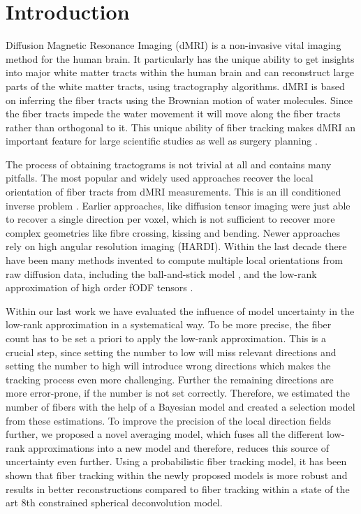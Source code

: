 \section{Introduction}
Diffusion Magnetic Resonance Imaging (dMRI) \cite{LeBihan:1986} is a
non-invasive vital imaging method for the human brain. It particularly has the
unique ability to get insights into major white matter tracts within the human
brain and can
reconstruct large parts of the white matter tracts, using tractography algorithms. dMRI is based on
inferring the fiber tracts using the Brownian motion of water molecules. Since
the fiber tracts impede the water movement it will move along the fiber tracts
rather than orthogonal to it. 
This unique ability of fiber tracking makes dMRI an important feature for large
scientific studies \cite{Sotiropoulos:2013, Tobisch:2018Frontiers} as well as surgery planning \cite{Yang:2021}.

The process of obtaining tractograms is not trivial at all and contains many
pitfalls. The most popular and widely used approaches recover the local
orientation of fiber tracts from dMRI measurements. This is an ill
conditioned inverse problem \cite{TOURNIER20071459}. Earlier approaches, like
diffusion tensor imaging \cite{BASSER1994247}
were just able to recover a single direction per voxel, which is not sufficient
to recover more complex geometries like fibre crossing, kissing and bending.
Newer approaches rely on high angular resolution imaging (HARDI). Within the
last decade there have been many methods invented to compute multiple local orientations
from raw diffusion data, including the
ball-and-stick model \cite{BEHRENS2007144}, and the low-rank approximation of high order fODF tensors
\cite{lowrank, Ankele:CARS2017}.

Within our last work we have evaluated the influence of model uncertainty in
the low-rank approximation in a systematical way. To be more precise, the fiber
count has to be set a priori to apply the low-rank approximation. This is a
crucial step, since setting the number to low will miss relevant directions and
setting the number to high will introduce wrong directions which makes the
tracking process even more challenging. Further the remaining directions are
more error-prone, if the number is not set correctly. 
Therefore, we estimated the number of fibers with the help of a Bayesian model and
created a selection model from these estimations. To improve the precision of
the local direction fields
further, we proposed a novel averaging model, which fuses all the different
low-rank approximations into a new model and therefore, reduces this source of
uncertainty even further.
Using a probabilistic fiber tracking model, it has been shown that fiber
tracking within the newly proposed models is more robust and results in
better reconstructions compared to fiber tracking within a state of the art
 $8$th constrained spherical deconvolution model.

